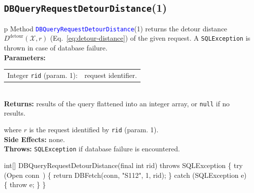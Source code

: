 \subsection{{\tt{}\protect{}DBQueryRequestDetourDistance}(1)}
\begin{tabular}{p{\textwidth}}
\toprule
{}
Method \textcolor{blue}{{\tt{}\protect{}DBQueryRequestDetourDistance}}(1) returns the
detour distance $D^\textrm{detour}(\mathcal{X},r)$
(Eq.~\ref{eq:detour-distance}) of the given request.
A {\tt{}SQLException} is thrown in case of database failure.\\
\midrule
\textbf{Parameters:}\\
\begin{tabular}{lp{116mm}}
Integer {\tt{}rid} (param. 1):&request identifier.
\end{tabular}\\
\textbf{Returns:} results of the query flattened into an integer array,
or {\tt{}null} if no results.


where $r$ is the request identified by {\tt{}rid} (param. 1).\\
\textbf{Side Effects:} none.\\
\textbf{Throws:} {\tt{}SQLException} if database failure is encountered.\\
\bottomrule
\end{tabular}
\nwenddocs{}\endmoddef{}
int[] DBQueryRequestDetourDistance(final int rid) throws SQLException \{
  try (\LA{}Open \code{}conn\edoc{}~{\nwtagstyle{}}\RA{}) \{
    return DBFetch(conn, "S112", 1, rid);
  \} catch (SQLException e) \{
    throw e;
  \}
\}
\eatline
{}\nwendcode{}\nwdocspar
